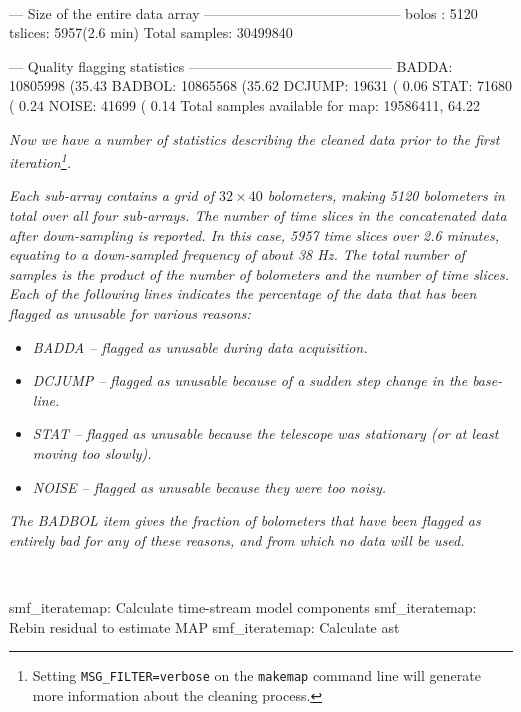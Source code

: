 ~
\begin{terminalv}
--- Size of the entire data array ------------------------------------------
bolos  : 5120
tslices: 5957(2.6 min)
Total samples: 30499840
\begin{terminalv}
--- Quality flagging statistics --------------------------------------------
 BADDA:   10805998 (35.43%
BADBOL:   10865568 (35.62%
DCJUMP:      19631 ( 0.06%
  STAT:      71680 ( 0.24%
 NOISE:      41699 ( 0.14%
Total samples available for map:   19586411, 64.22%
\end{terminalv}

\emph{Now we have a number of statistics describing the cleaned data
prior to the first iteration\footnote{Setting
\texttt{MSG\_FILTER=verbose} on the \texttt{makemap} command line will
generate more information about the cleaning process.}.}

\emph{Each sub-array contains a grid of $32\times40$ bolometers, making 5120
bolometers in total over all four sub-arrays. The number of time slices in
the concatenated data after down-sampling is reported. In this case, 5957
time slices over 2.6 minutes, equating to a down-sampled frequency of about
38 Hz. The total number of samples is the product of the number of
bolometers and the number of time slices. Each of the following lines
indicates the percentage of the data that has been flagged as unusable for
various reasons:}

\begin{itemize}
\item \emph{BADDA -- flagged as unusable during data acquisition.}
\item \emph{DCJUMP -- flagged as unusable because of a sudden step change in
the base-line.}
\item \emph{STAT -- flagged as unusable because the telescope was stationary
(or at least moving too slowly).}
\item \emph{NOISE -- flagged as unusable because they were too noisy.}
\end{itemize}

\emph{The BADBOL item gives the fraction of bolometers that have been
flagged as entirely bad for any of these reasons, and from which no data
will be used.}

~
\begin{terminalv}
smf_iteratemap: Calculate time-stream model components
smf_iteratemap: Rebin residual to estimate MAP
smf_iteratemap: Calculate ast
\end{terminalv}


\end{terminalv}
